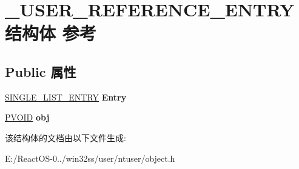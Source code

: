 \hypertarget{struct___u_s_e_r___r_e_f_e_r_e_n_c_e___e_n_t_r_y}{}\section{\+\_\+\+U\+S\+E\+R\+\_\+\+R\+E\+F\+E\+R\+E\+N\+C\+E\+\_\+\+E\+N\+T\+R\+Y结构体 参考}
\label{struct___u_s_e_r___r_e_f_e_r_e_n_c_e___e_n_t_r_y}
\subsection*{Public 属性}
\begin{DoxyCompactItemize}
\item 
\mbox{\label{struct___u_s_e_r___r_e_f_e_r_e_n_c_e___e_n_t_r_y_a522ca843c340d76775cb6810db5e15fc}} 
\hyperlink{struct___s_i_n_g_l_e___l_i_s_t___e_n_t_r_y}{S\+I\+N\+G\+L\+E\+\_\+\+L\+I\+S\+T\+\_\+\+E\+N\+T\+RY} {\bfseries Entry}
\item 
\mbox{\label{struct___u_s_e_r___r_e_f_e_r_e_n_c_e___e_n_t_r_y_abbca52216268aefca6717a488abcdabd}} 
\hyperlink{interfacevoid}{P\+V\+O\+ID} {\bfseries obj}
\end{DoxyCompactItemize}


该结构体的文档由以下文件生成\+:\begin{DoxyCompactItemize}
\item 
E\+:/\+React\+O\+S-\/0../win32ss/user/ntuser/object.\+h\end{DoxyCompactItemize}
